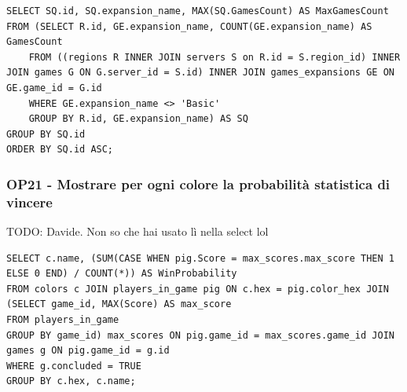 \begin{lstlisting}[style=sql]
SELECT SQ.id, SQ.expansion_name, MAX(SQ.GamesCount) AS MaxGamesCount
FROM (SELECT R.id, GE.expansion_name, COUNT(GE.expansion_name) AS GamesCount
    FROM ((regions R INNER JOIN servers S on R.id = S.region_id) INNER JOIN games G ON G.server_id = S.id) INNER JOIN games_expansions GE ON GE.game_id = G.id
    WHERE GE.expansion_name <> 'Basic'
    GROUP BY R.id, GE.expansion_name) AS SQ
GROUP BY SQ.id
ORDER BY SQ.id ASC;
\end{lstlisting}

\subsubsection*{OP21 - Mostrare per ogni colore la probabilità statistica di vincere}
TODO: Davide. Non so che hai usato lì nella select lol
\medskip

\begin{lstlisting}[style=sql]
SELECT c.name, (SUM(CASE WHEN pig.Score = max_scores.max_score THEN 1 ELSE 0 END) / COUNT(*)) AS WinProbability
FROM colors c JOIN players_in_game pig ON c.hex = pig.color_hex JOIN (SELECT game_id, MAX(Score) AS max_score
FROM players_in_game
GROUP BY game_id) max_scores ON pig.game_id = max_scores.game_id JOIN games g ON pig.game_id = g.id
WHERE g.concluded = TRUE
GROUP BY c.hex, c.name;
\end{lstlisting}
